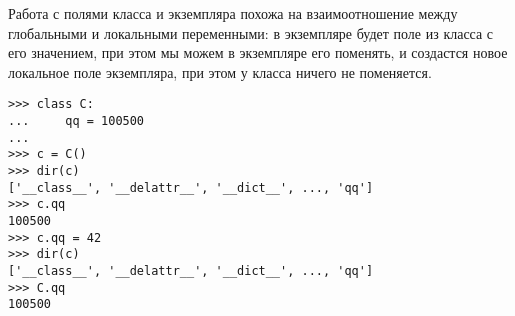 Работа с полями класса и экземпляра похожа на взаимоотношение между глобальными и локальными переменными: в экземпляре будет поле из класса с его значением, при этом мы можем в экземпляре его поменять, и создастся новое локальное поле экземпляра, при этом у класса ничего не поменяется.

\begin{verbatim}
>>> class C:
...     qq = 100500
...
>>> c = C()
>>> dir(c)
['__class__', '__delattr__', '__dict__', ..., 'qq']
>>> c.qq
100500
>>> c.qq = 42
>>> dir(c)
['__class__', '__delattr__', '__dict__', ..., 'qq']
>>> C.qq
100500
\end{verbatim}
